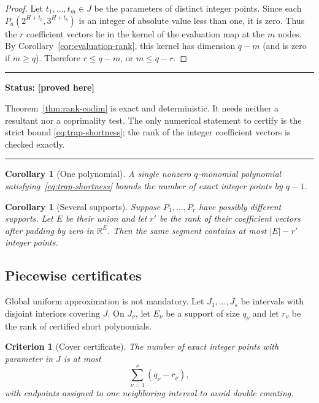 \documentclass[11pt,oneside]{article}
\newtheorem{corollary}[theorem]{Corollary}
\newtheorem{criterion}[theorem]{Criterion}
\theoremstyle{definition}
\theoremstyle{remark}
\newcommand{\R}{\mathbb R}
\newcommand{\statusproved}{\textcolor{provedgreen}{\textbf{[proved here]}}}
\newenvironment{statusbox}[1]
{\begin{center}\begin{minipage}{0.94\textwidth}\raggedright\hrule\vspace{0.45em}\textbf{Status:} #1\par\vspace{0.35em}}
{\vspace{0.35em}\hrule\end{minipage}\end{center}}
\begin{document}
\begin{proof}
Let $t_1,\ldots,t_m\in J$ be the parameters of distinct integer points.  Since each
$P_a(2^{H+t_b},3^{H+t_b})$ is an integer of absolute value less than one, it is zero.  Thus the
$r$ coefficient vectors lie in the kernel of the evaluation map at the $m$ nodes.  By
Corollary~\ref{cor:evaluation-rank}, this kernel has dimension $q-m$ (and is zero if $m\ge q$).
Therefore $r\le q-m$, or $m\le q-r$.
\end{proof}

\begin{statusbox}{\statusproved}
Theorem~\ref{thm:rank-codim} is exact and deterministic.  It needs neither a resultant nor a
coprimality test.  The only numerical statement to certify is the strict bound
\eqref{eq:trap-shortness}; the rank of the integer coefficient vectors is checked exactly.
\end{statusbox}

\begin{corollary}[One polynomial]
\label{cor:one-polynomial}
A single nonzero $q$-monomial polynomial satisfying~\eqref{eq:trap-shortness} bounds the number
of exact integer points by $q-1$.
\end{corollary}

\begin{corollary}[Several supports]
\label{cor:union-support}
Suppose $P_1,\ldots,P_r$ have possibly different supports.  Let $E$ be their union and let
$r'$ be the rank of their coefficient vectors after padding by zero in $\R^E$.  Then the same
segment contains at most $|E|-r'$ integer points.
\end{corollary}

\subsection{Piecewise certificates}

Global uniform approximation is not mandatory.  Let $J_1,\ldots,J_s$ be intervals with
disjoint interiors covering $J$.  On $J_\nu$, let $E_\nu$ be a support of size $q_\nu$ and
let $r_\nu$ be the rank of certified short polynomials.

\begin{criterion}[Cover certificate]
\label{crit:cover}
The number of exact integer points with parameter in $J$ is at most
\begin{equation}
 \sum_{\nu=1}^s(q_\nu-r_\nu),
 \label{eq:cover-defect}
\end{equation}
with endpoints assigned to one neighboring interval to avoid double counting.
\end{criterion}
\end{document}
